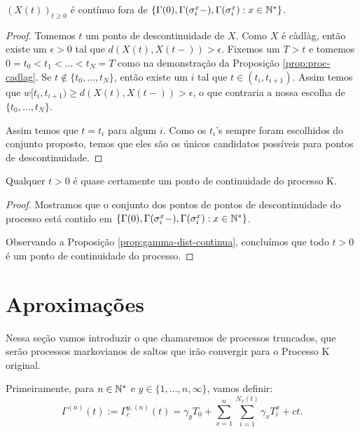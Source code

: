 \begin{proposicao}
  \label{prop:proc-descontinuidades}
  $(X(t))_{t\geq 0}$ é \qc contínuo fora de $\{ \Gamma(0),
  \Gamma(\sigma_i^x-), \Gamma(\sigma_i^x): x \in {\mathbb{N^*}}\}$.
\end{proposicao}
\begin{proof}
  Tomemos $t$ um ponto de descontinuidade de $X$. Como $X$ é càdlàg,
  então existe um $\epsilon > 0$ tal que $d(X(t), X(t-)) > \epsilon$.
  Fixemos um $T > t$ e tomemos $0 = t_0 < t_1 < \ldots < t_N = T$ como na
  demonstração da Proposição \ref{prop:proc-cadlag}. Se $t \not\in
  \{t_0, \ldots, t_N\}$, então existe um $i$ tal que $t \in (t_i,
  t_{i+1})$. Assim temos que $w[t_i, t_{i+1}) \geq d(X(t), X(t-)) >
  \epsilon$, o que contraria a nossa escolha de $\{t_0, \ldots, t_N\}$.

  Assim temos que $t = t_i$ para algum $i$. Como os $t_i$'s sempre
  foram escolhidos do conjunto proposto, temos que eles são os únicos
  candidatos possíveis para pontos de descontinuidade.
\end{proof}

\begin{corolario}
  \label{cor:continuidades-processo}
  Qualquer $t > 0$ é quase certamente um ponto de continuidade do
  processo K.
\end{corolario}
\begin{proof}
  Mostramos que o conjunto dos pontos de pontos de descontinuidade do
  processo está contido em $\{ \Gamma(0), \Gamma(\sigma_i^x-),
  \Gamma(\sigma_i^x): x \in {\mathbb{N^*}}\}$.

  Observando a Proposição \ref{prop:gamma-dist-continua}, concluímos
  que todo $t > 0$ é \qc um ponto de continuidade do processo.
\end{proof}



\section{Aproximações}
\label{sec:aproximacoes}

Nessa seção vamos introduzir o que chamaremos de processos truncados,
que serão processos markovianos de saltos que irão convergir para o
Processo K original.

Primeiramente, para $n \in {\mathbb{N^*}}$ e $y \in \{1, \ldots, n, \infty\}$,
vamos definir:
\begin{displaymath}
  \Gamma^{(n)} (t) := \Gamma^{y,(n)}_c (t) = \gamma_y T_0
  + \sum_{x =1}^{n} \sum_{i = 1}^{N_x(t)}
  \gamma_x T_i^x
  + ct.
\end{displaymath}

